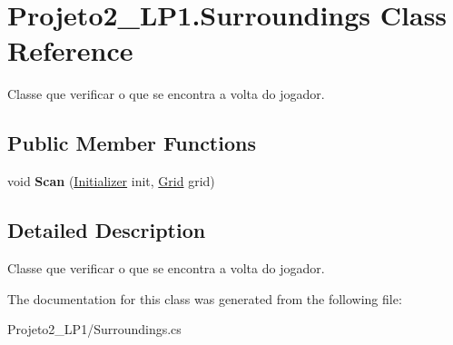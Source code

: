 \hypertarget{class_projeto2___l_p1_1_1_surroundings}{}\section{Projeto2\+\_\+\+L\+P1.\+Surroundings Class Reference}
\label{class_projeto2___l_p1_1_1_surroundings}


Classe que verificar o que se encontra a volta do jogador.  


\subsection*{Public Member Functions}
\begin{DoxyCompactItemize}
\item 
\mbox{\label{class_projeto2___l_p1_1_1_surroundings_a5a65287732e0939f0f18c9426fdeb220}} 
void {\bfseries Scan} (\mbox{\hyperlink{class_projeto2___l_p1_1_1_initializer}{Initializer}} init, \mbox{\hyperlink{class_projeto2___l_p1_1_1_grid}{Grid}} grid)
\end{DoxyCompactItemize}


\subsection{Detailed Description}
Classe que verificar o que se encontra a volta do jogador. 



The documentation for this class was generated from the following file\+:\begin{DoxyCompactItemize}
\item 
Projeto2\+\_\+\+L\+P1/Surroundings.\+cs\end{DoxyCompactItemize}
